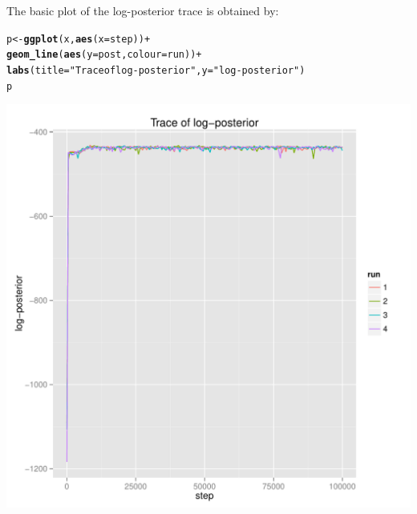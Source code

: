 \documentclass{article}\usepackage[]{graphicx}\usepackage[]{color}
\makeatletter
\newcommand{\hlstr}[1]{\textcolor[rgb]{0.192,0.494,0.8}{#1}}%
\newcommand{\hlopt}[1]{\textcolor[rgb]{0,0,0}{#1}}%
\newcommand{\hlstd}[1]{\textcolor[rgb]{0.345,0.345,0.345}{#1}}%
\newcommand{\hlkwb}[1]{\textcolor[rgb]{0.69,0.353,0.396}{#1}}%
\newcommand{\hlkwc}[1]{\textcolor[rgb]{0.333,0.667,0.333}{#1}}%
\newcommand{\hlkwd}[1]{\textcolor[rgb]{0.737,0.353,0.396}{\textbf{#1}}}%
\newenvironment{kframe}{%
 \def\at@end@of@kframe{}%
 \ifinner\ifhmode%
  \def\at@end@of@kframe{\end{minipage}}%
  \begin{minipage}{\columnwidth}%
 \fi\fi%
 \def\FrameCommand##1{\hskip\@totalleftmargin \hskip-\fboxsep
 \colorbox{shadecolor}{##1}\hskip-\fboxsep
     \hskip-\linewidth \hskip-\@totalleftmargin \hskip\columnwidth}%
 \MakeFramed {\advance\hsize-\width
   \@totalleftmargin\z@ \linewidth\hsize
   \@setminipage}}%
 {\par\unskip\endMakeFramed%
 \at@end@of@kframe}
\newenvironment{knitrout}{}{} %
\makeatother
\begin{document}
The basic plot of the log-posterior trace is obtained by:
\begin{knitrout}
\color{fgcolor}\begin{kframe}
\begin{alltt}
\hlstd{p} \hlkwb{<-} \hlkwd{ggplot}\hlstd{(x,} \hlkwd{aes}\hlstd{(}\hlkwc{x}\hlstd{=step))} \hlopt{+}
    \hlkwd{geom_line}\hlstd{(}\hlkwd{aes}\hlstd{(}\hlkwc{y}\hlstd{=post,} \hlkwc{colour}\hlstd{=run))} \hlopt{+}
    \hlkwd{labs}\hlstd{(}\hlkwc{title}\hlstd{=}\hlstr{"Trace of log-posterior"}\hlstd{,} \hlkwc{y}\hlstd{=}\hlstr{"log-posterior"}\hlstd{)}
\hlstd{p}
\end{alltt}
\end{kframe}

{\centering \includegraphics[width=.6\textwidth]{figs/unnamed-chunk-14} 

}



\end{knitrout}
\end{document}
